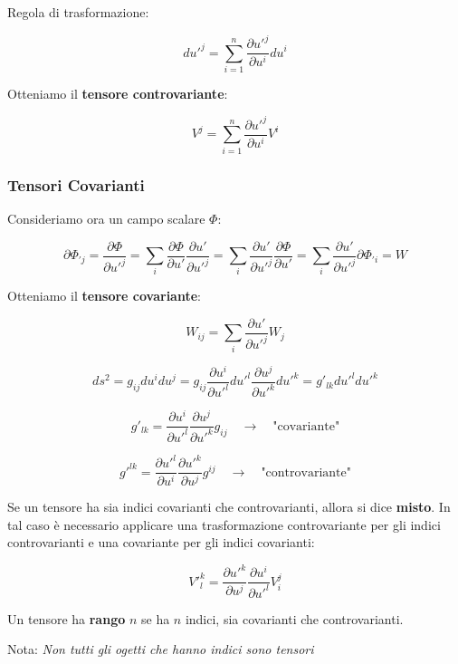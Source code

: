 Regola di trasformazione:

$$
du'^j = \sum_{i=1}^{n} \dfrac {\partial u'^j}{\partial u^i} du^i
$$

Otteniamo il \textbf{tensore controvariante}:

$$
\boxed{
V^{j} = \sum_{i=1}^{n} \dfrac {\partial u'^j}{\partial u^i} V^{i} 
}
$$

\subsubsection{Tensori Covarianti}

Consideriamo ora un campo scalare $\Phi$:

$$
\partial \Phi_{'j} = \dfrac{\partial \Phi} {\partial u'^j} 
= \sum_i \dfrac{\partial \Phi} {\partial u'} \dfrac{\partial u'} {\partial u'^j}
= \sum_i \dfrac{\partial u'} {\partial u'^j} \dfrac{\partial \Phi} {\partial u'} 
= \sum_i \dfrac{\partial u'} {\partial u'^j} \partial \Phi_{'i} = W
$$

Otteniamo il \textbf{tensore covariante}:

$$
\boxed{
W_{ij} = \sum_i \dfrac{\partial u'} {\partial u'^j} W_j
}
$$

$$
ds^2 = g_{ij} du^i du^j = g_{ij} \dfrac {\partial u^i}{\partial u'^l} du'^l \dfrac {\partial u^j}{\partial u'^k} du'^k = g'_{lk} du'^l du'^k 
$$

$$
g'_{lk} = \dfrac {\partial u^i}{\partial u'^l} \dfrac {\partial u^j}{\partial u'^k} g_{ij} \quad \rightarrow \quad \text{"covariante"}
$$

$$
g'^{lk} = \dfrac {\partial u'^l}{\partial u^i} \dfrac {\partial u'^k}{\partial u^j} g^{ij} \quad \rightarrow \quad \text{"controvariante"}
$$

Se un tensore ha sia indici covarianti che controvarianti, allora si dice \textbf{misto}. In tal caso è necessario applicare una trasformazione controvariante per gli indici controvarianti e una covariante per gli indici covarianti:

$$
V'^k_l = \dfrac {\partial u'^k}{\partial u^j} \dfrac {\partial u^i}{\partial u'^l} V^j_i
$$

\begin{observationblock}
    Un tensore ha \textbf{rango} $n$ se ha $n$ indici, sia covarianti che controvarianti.

    Nota: \textit{Non tutti gli ogetti che hanno indici sono tensori}
\end{observationblock}

